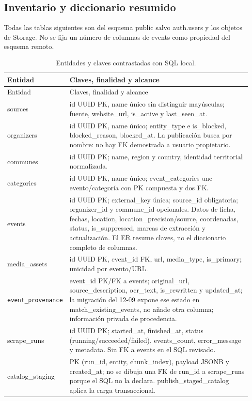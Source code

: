 \subsection{Inventario y diccionario resumido}
Todas las tablas siguientes son del esquema public salvo auth.users y los objetos de Storage.
No se fija un número de columnas de events como propiedad del esquema remoto.
\begin{longtable}{p{4.0cm}p{9.6cm}}
\caption{Entidades y claves contrastadas con SQL local.}\label{tab:tablas}\\
\toprule Entidad & Claves, finalidad y alcance \\\midrule\endfirsthead
\toprule Entidad & Claves, finalidad y alcance \\\midrule\endhead
sources & id UUID PK, name único sin distinguir mayúsculas; fuente, website\_url, is\_active y last\_seen\_at. \\
organizers & id UUID PK, name único; entity\_type e is\_blocked, blocked\_reason, blocked\_at. La publicación busca por nombre: no hay FK demostrada a usuario propietario. \\
communes & id UUID PK; name, region y country, identidad territorial normalizada. \\
categories & id UUID PK, name único; event\_categories une evento/categoría con PK compuesta y dos FK. \\
events & id UUID PK; external\_key única; source\_id obligatoria; organizer\_id y commune\_id opcionales. Datos de ficha, fechas, location, location\_precision/source, coordenadas, status, is\_suppressed, marcas de extracción y actualización. El ER resume claves, no el diccionario completo de columnas. \\
media\_assets & id UUID PK, event\_id FK, url, media\_type, is\_primary; unicidad por evento/URL. \\
\nolinkurl{event_provenance} & event\_id PK/FK a events; original\_url, source\_description, ocr\_text, is\_rewritten y updated\_at; la migración del 12-09 expone ese estado en match\_existing\_events, no añade otra columna; información privada de procedencia. \\
scrape\_runs & id UUID PK; started\_at, finished\_at, status (running/succeeded/failed), events\_count, error\_message y metadata. Sin FK a events en el SQL revisado. \\
catalog\_staging & PK (run\_id, entity, chunk\_index), payload JSONB y created\_at; no se dibuja una FK de run\_id a scrape\_runs porque el SQL no la declara. publish\_staged\_catalog aplica la carga transaccional. \\

\end{longtable}
